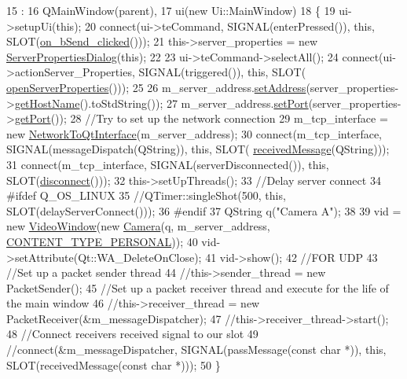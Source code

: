 \begin{DoxyCode}
15                                       :
16     QMainWindow(parent),
17     ui(\textcolor{keyword}{new} Ui::MainWindow)
18 \{
19     ui->setupUi(\textcolor{keyword}{this});
20     connect(ui->teCommand, SIGNAL(enterPressed()), \textcolor{keyword}{this}, SLOT(\hyperlink{classMainWindow_a2605ed0a3de91bd4e13316d16887fd60}{on\_bSend\_clicked}()));
21     this->server\_properties = \textcolor{keyword}{new} \hyperlink{classServerPropertiesDialog}{ServerPropertiesDialog}(\textcolor{keyword}{this});
22 
23     ui->teCommand->selectAll();
24     connect(ui->actionServer\_Properties, SIGNAL(triggered()), \textcolor{keyword}{this}, SLOT(
      \hyperlink{classMainWindow_a4358d0320935424d76a693791b1066f5}{openServerProperties}()));
25 
26     m\_server\_address.\hyperlink{classAddress_a43ba5f8001b7e729b83b1b9299294495}{setAddress}(server\_properties->\hyperlink{classServerPropertiesDialog_ae2fe6ffc4e0c04a9043a14a96f6aa5e9}{getHostName}().toStdString());
27     m\_server\_address.\hyperlink{classAddress_ad73c29200f7d63641e48ebfc16efaf75}{setPort}(server\_properties->\hyperlink{classServerPropertiesDialog_a00869f1fe5e8418017acfa6f351020d1}{getPort}());
28     \textcolor{comment}{//Try to set up the network connection}
29     m\_tcp\_interface = \textcolor{keyword}{new} \hyperlink{classNetworkToQtInterface}{NetworkToQtInterface}(m\_server\_address);
30     connect(m\_tcp\_interface, SIGNAL(messageDispatch(QString)), \textcolor{keyword}{this}, SLOT(
      \hyperlink{classMainWindow_ab7ed8f9211b6a43151b645f94a019502}{receivedMessage}(QString)));
31     connect(m\_tcp\_interface, SIGNAL(serverDisconnected()), \textcolor{keyword}{this}, SLOT(\hyperlink{classMainWindow_ac2886ac3cabca51c9b4ff8643dfbeff8}{disconnect}()));
32     this->setUpThreads();
33     \textcolor{comment}{//Delay server connect}
34 \textcolor{preprocessor}{#ifdef Q\_OS\_LINUX}
35 \textcolor{preprocessor}{}    \textcolor{comment}{//QTimer::singleShot(500, this, SLOT(delayServerConnect()));}
36 \textcolor{preprocessor}{#endif}
37 \textcolor{preprocessor}{}    QString q(\textcolor{stringliteral}{"Camera A"});
38 
39     vid = \textcolor{keyword}{new} \hyperlink{classVideoWindow}{VideoWindow}(\textcolor{keyword}{new} \hyperlink{classCamera}{Camera}(q, m\_server\_address, 
      \hyperlink{camera_8h_a10395294162cb49637e9c8f6efdb10eaa8845b57cef431c1017ee723500b2d1f5}{CONTENT\_TYPE\_PERSONAL}));
40     vid->setAttribute(Qt::WA\_DeleteOnClose);
41     vid->show();
42     \textcolor{comment}{//FOR UDP}
43     \textcolor{comment}{//Set up a packet sender thread}
44     \textcolor{comment}{//this->sender\_thread = new PacketSender();}
45     \textcolor{comment}{//Set up a packet receiver thread and execute for the life of the main window}
46     \textcolor{comment}{//this->receiver\_thread = new PacketReceiver(&m\_messageDispatcher);}
47     \textcolor{comment}{//this->receiver\_thread->start();}
48     \textcolor{comment}{//Connect receivers received signal to our slot}
49     \textcolor{comment}{//connect(&m\_messageDispatcher, SIGNAL(passMessage(const char *)), this, SLOT(receivedMessage(const
       char *)));}
50 \}
\end{DoxyCode}
